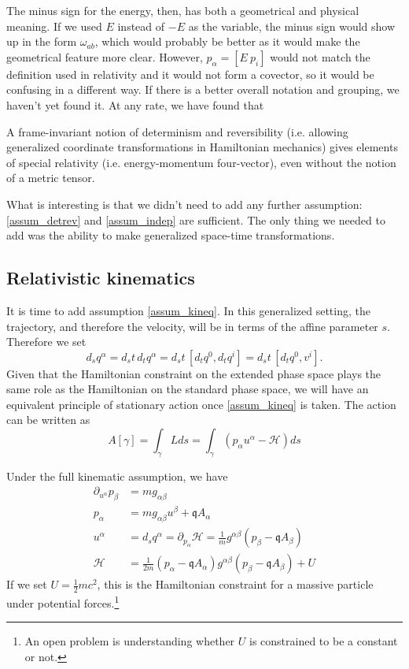 The minus sign for the energy, then, has both a geometrical and physical meaning. If we used $E$ instead of $-E$ as the variable, the minus sign would show up in the form $\omega_{ab}$, which would probably be better as it would make the geometrical feature more clear. However, $p_\alpha = [ E \ p_i]$ would not match the definition used in relativity and it would not form a covector, so it would be confusing in a different way. If there is a better overall notation and grouping, we haven't yet found it. At any rate, we have found that
\begin{insight}
	A frame-invariant notion of determinism and reversibility (i.e. allowing generalized coordinate transformations in Hamiltonian mechanics) gives elements of special relativity (i.e. energy-momentum four-vector), even without the notion of a metric tensor.
\end{insight}

What is interesting is that we didn't need to add any further assumption: \ref{assum_detrev} and \ref{assum_indep} are sufficient. The only thing we needed to add was the ability to make generalized space-time transformations.

\subsection{Relativistic kinematics}

It is time to add assumption \ref{assum_kineq}. In this generalized setting, the trajectory, and therefore the velocity, will be in terms of the affine parameter $s$. Therefore we set
\begin{equation}
	d_s q^\alpha  = d_s t \, d_t q^\alpha = d_s t \, [ d_t q^0, d_t q^i  ] = d_s t \, [ d_t q^0, v^i  ] .
\end{equation}
Given that the Hamiltonian constraint on the extended phase space plays the same role as the Hamiltonian on the standard phase space, we will have an equivalent principle of stationary action once \ref{assum_kineq} is taken. The action can be written as
\begin{equation}
	A[\gamma] = \int_\gamma Lds = \int_\gamma \left( p_\alpha u^\alpha - \mathcal{H} \right) ds
\end{equation}

Under the full kinematic assumption, we have
\begin{equation}
	\begin{aligned}
	\partial_{u^\alpha} p_\beta &= mg_{\alpha \beta} \\
	p_{\alpha} &= mg_{\alpha \beta} u^\beta + \mathfrak{q} A_{\alpha} \\
u^{\alpha} &= d_s q^\alpha = \partial_{p_\alpha} \mathcal{H} = \frac{1}{m} g^{\alpha \beta} (p_\beta - \mathfrak{q} A_\beta) \\
\mathcal{H} &= \frac{1}{2m}\left(p_\alpha - \mathfrak{q} A_{\alpha}\right)g^{\alpha \beta} \left(p_\beta - \mathfrak{q} A_{\beta}\right) + U
	\end{aligned}
\end{equation}
If we set $U=\frac{1}{2} m c^2$, this is the Hamiltonian constraint for a massive particle under potential forces.\footnote{An open problem is understanding whether $U$ is constrained to be a constant or not.}

